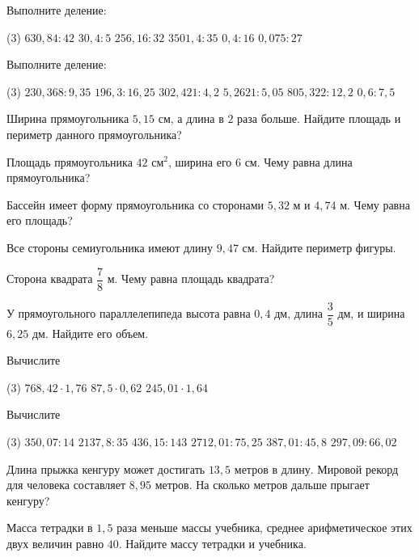 \begin{class}[number=2]
	\begin{listofex}
		\item Выполните деление:
		\begin{tasks}(3)
			\task \( 630,84: 42 \)
			\task \( 30,4:5 \) 
			\task \( 256,16:32 \)  
			\task \( 3501,4:35 \)  
			\task \( 0,4:16 \)  
			\task \( 0,075:27 \)  
		\end{tasks}
		\item Выполните деление:
		\begin{tasks}(3)
			\task \( 230,368: 9,35 \)
			\task \( 196,3:16,25 \) 
			\task \( 302,421:4,2 \)  
			\task \( 5,2621:5,05 \)  
			\task \( 805,322:12,2 \)  
			\task \( 0,6:7,5 \)  
		\end{tasks}
		\item Ширина прямоугольника \( 5,15 \) см, а длина в \( 2 \) раза больше. Найдите площадь и периметр данного прямоугольника?
		\item Площадь прямоугольника \( 42 \) см\( ^{2} \), ширина его \( 6 \) см. Чему равна длина прямоугольника?
		\item Бассейн имеет форму прямоугольника со сторонами \( 5,32 \) м и \( 4,74 \) м. Чему равна его площадь?
		\item Все стороны семиугольника имеют длину \( 9,47 \) см. Найдите периметр фигуры.
		\item Сторона квадрата \( \dfrac{7}{8} \) м. Чему равна площадь квадрата?
		\item У прямоугольного параллелепипеда высота равна \( 0,4 \) дм, длина \( \dfrac{3}{5} \) дм, и ширина \( 6,25 \) дм. Найдите его объем.
		
	\end{listofex}
\end{class}

\begin{homework}[number=1]
	\begin{listofex}
		\item Вычислите
		\begin{tasks}(3)
			\task \( 768,42\cdot1,76 \)
			\task \( 87,5\cdot0,62 \)
			\task \( 245,01\cdot1,64 \)
		\end{tasks}
		\item Вычислите
		\begin{tasks}(3)
			\task \( 350,07:14 \)
			\task \( 2137,8:35 \)
			\task \( 436,15:143 \)
			\task \( 2712,01:75,25 \)
			\task \( 387,01:45,8 \)
			\task \( 297,09:66,02 \)
		\end{tasks}
		\item Длина прыжка кенгуру может достигать \( 13,5 \) метров в длину. Мировой рекорд для человека составляет \( 8,95 \) метров. На сколько метров дальше прыгает кенгуру?
		\item Масса тетрадки в \( 1,5 \) раза меньше массы учебника, среднее арифметическое этих двух величин равно \( 40 \). Найдите массу тетрадки и учебника.
	\end{listofex}
\end{homework}

